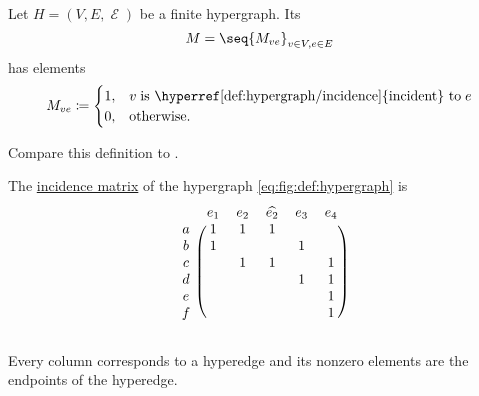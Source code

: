 \begin{definition}\label{def:hypergraph_incidence_matrix}
  Let \( H = (V, E, \mscrE) \) be a finite hypergraph. Its 
  \begin{equation*}
    M = \seq{ M_{ve} }_{v \in V, e \in E}
  \end{equation*}
  has elements
  \begin{equation*}
    M_{ve} \coloneqq \begin{cases}
      1,  &v \T{is \hyperref[def:hypergraph/incidence]{incident} to} e \\
      0,  &\T{otherwise.}
    \end{cases}
  \end{equation*}

  Compare this definition to .
\end{definition}

\begin{example}\label{ex:def:hypergraph_incidence_matrix}
  The \hyperref[def:hypergraph_incidence_matrix]{incidence matrix} of the hypergraph \eqref{eq:fig:def:hypergraph} is
  \begin{equation}\label{eq:ex:def:hypergraph_incidence_matrix}
    \begin{blockarray}{cccccc}
        & e_1 & e_2 & \widehat{e_2} & e_3 & e_4 \\
      \begin{block}{c(ccccc)}
      a & 1   & 1   & 1             &     &     \\
      b & 1   &     &               & 1   &     \\
      c &     & 1   & 1             &     & 1   \\
      d &     &     &               & 1   & 1   \\
      e &     &     &               &     & 1   \\
      f &     &     &               &     & 1   \\
      \end{block}
    \end{blockarray}
  \end{equation}

  Every column corresponds to a hyperedge and its nonzero elements are the endpoints of the hyperedge.
\end{example}


